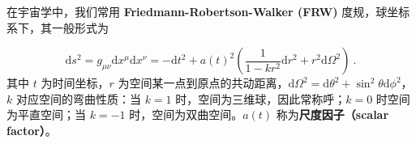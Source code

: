 
在宇宙学中，我们常用 \textbf{Friedmann-Robertson-Walker (FRW)} 度规，球坐标系下，其一般形式为

\begin{equation}
\mathrm{d}s^2=g_{\mu\nu}\mathrm{d}x^{\mu}\mathrm{d}x^{\nu}=-\mathrm{d}t^2+a(t)^2 \left( \frac{1}{1-kr^2}\mathrm{d}r^2+r^2 \mathrm{d} \Omega^2\right)~.
\end{equation}
其中 $t$ 为时间坐标，$r$ 为空间某一点到原点的共动距离，$\mathrm{d} \Omega^2 =\mathrm{d} \theta^2 + \sin^2\theta\mathrm{d} \phi^2 $，$k$ 对应空间的弯曲性质：当 $k=1$ 时，空间为三维球，因此常称呼；$k=0$ 时空间为平直空间；当 $k=-1$ 时，空间为双曲空间。$a(t)$ 称为\textbf{尺度因子（scalar factor）}。
